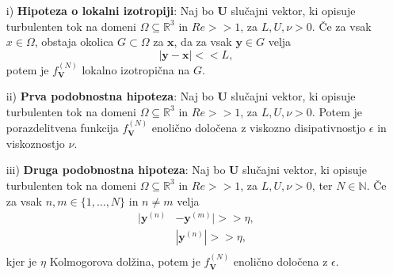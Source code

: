 \documentclass[mat2, tisk]{fmfdelo}
\newcommand{\R}{\mathbb R}
\newcommand{\N}{\mathbb N}
\newcommand{\bd}{\textbf}
\begin{document}
\begin{enumerate}
  \item[i)] \textbf{Hipoteza o lokalni izotropiji}: Naj bo $\bd{U}$ slučajni vektor,
  ki opisuje turbulenten tok na domeni $\Omega \subseteq \R^3$ in $Re >\!\!> 1$, za $L, U, \nu > 0$. Če 
  za vsak $x\in \Omega$, obstaja okolica $G \subset \Omega$ za $\bd{x}$, da za vsak 
  $\bd{y}\in G$ velja $$ |\bd{y} - \bd{x}| <\!\!< L,$$ potem je $f_\bd{V}^{(N)}$ lokalno 
  izotropična na $G$.
  \item[ii)] \textbf{Prva podobnostna hipoteza}: Naj bo $\bd{U}$ slučajni vektor,
  ki opisuje turbulenten tok na domeni $\Omega \subseteq \R^3$ in $Re >\!\!> 1$, za $L, U, \nu > 0$.
  Potem je porazdelitvena funkcija $f_\bd{V}^{(N)}$ enolično določena 
  z viskozno disipativnostjo $\epsilon$ in viskoznostjo $\nu$.
  \item[iii)] \textbf{Druga podobnostna hipoteza}: Naj bo $\bd{U}$ slučajni vektor,
  ki opisuje turbulenten tok na domeni $\Omega \subseteq \R^3$ in $Re >\!\!> 1$, za $L, U, \nu > 0$, ter $N\in \N$.
  Če za vsak $n, m \in \{1, \dots, N\}$ in $n\neq m$ velja 
  \begin{align*}
  |\bd{y}^{(n)} &- \bd{y}^{(m)}| >\!\!> \eta,\\
  &|\bd{y}^{(n)}|>\!\!> \eta, \\
\end{align*}
kjer je $\eta$ Kolmogorova dolžina, potem je $f_\bd{V}^{(N)}$ enolično 
določena z $\epsilon$.
\end{enumerate}
\end{document}
